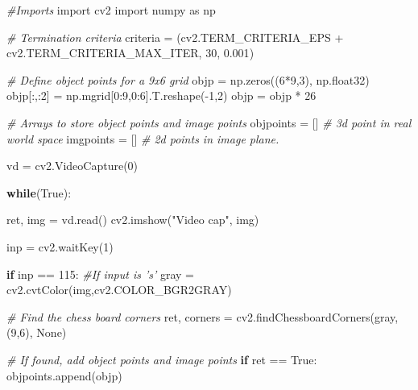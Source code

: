 \documentclass[]{article}
\newenvironment{Shaded}{}{}
\newcommand{\DecValTok}[1]{\textcolor[rgb]{0.25,0.63,0.44}{{#1}}}
\newcommand{\FloatTok}[1]{\textcolor[rgb]{0.25,0.63,0.44}{{#1}}}
\newcommand{\StringTok}[1]{\textcolor[rgb]{0.25,0.44,0.63}{{#1}}}
\newcommand{\ImportTok}[1]{{#1}}
\newcommand{\CommentTok}[1]{\textcolor[rgb]{0.38,0.63,0.69}{\textit{{#1}}}}
\newcommand{\VariableTok}[1]{\textcolor[rgb]{0.10,0.09,0.49}{{#1}}}
\newcommand{\ControlFlowTok}[1]{\textcolor[rgb]{0.00,0.44,0.13}{\textbf{{#1}}}}
\newcommand{\OperatorTok}[1]{\textcolor[rgb]{0.40,0.40,0.40}{{#1}}}
\newcommand{\NormalTok}[1]{{#1}}
\begin{document}
\begin{Shaded}
\begin{Highlighting}[]
\CommentTok{#Imports}
\ImportTok{import} \NormalTok{cv2}
\ImportTok{import} \NormalTok{numpy }\ImportTok{as} \NormalTok{np}

\CommentTok{# Termination criteria}
\NormalTok{criteria }\OperatorTok{=} \NormalTok{(cv2.TERM_CRITERIA_EPS }\OperatorTok{+} \NormalTok{cv2.TERM_CRITERIA_MAX_ITER, }\DecValTok{30}\NormalTok{, }\FloatTok{0.001}\NormalTok{)}

\CommentTok{# Define object points for a 9x6 grid}
\NormalTok{objp }\OperatorTok{=} \NormalTok{np.zeros((}\DecValTok{6}\OperatorTok{*}\DecValTok{9}\NormalTok{,}\DecValTok{3}\NormalTok{), np.float32)}
\NormalTok{objp[:,:}\DecValTok{2}\NormalTok{] }\OperatorTok{=} \NormalTok{np.mgrid[}\DecValTok{0}\NormalTok{:}\DecValTok{9}\NormalTok{,}\DecValTok{0}\NormalTok{:}\DecValTok{6}\NormalTok{].T.reshape(}\OperatorTok{-}\DecValTok{1}\NormalTok{,}\DecValTok{2}\NormalTok{)}
\NormalTok{objp }\OperatorTok{=} \NormalTok{objp }\OperatorTok{*} \DecValTok{26}

\CommentTok{# Arrays to store object points and image points}
\NormalTok{objpoints }\OperatorTok{=} \NormalTok{[] }\CommentTok{# 3d point in real world space}
\NormalTok{imgpoints }\OperatorTok{=} \NormalTok{[] }\CommentTok{# 2d points in image plane.}

\NormalTok{vd }\OperatorTok{=} \NormalTok{cv2.VideoCapture(}\DecValTok{0}\NormalTok{)}

\ControlFlowTok{while}\NormalTok{(}\VariableTok{True}\NormalTok{):}

    \NormalTok{ret, img }\OperatorTok{=} \NormalTok{vd.read()}
    \NormalTok{cv2.imshow(}\StringTok{"Video cap"}\NormalTok{, img)}
   
    \NormalTok{inp }\OperatorTok{=} \NormalTok{cv2.waitKey(}\DecValTok{1}\NormalTok{)}
    
    \ControlFlowTok{if} \NormalTok{inp }\OperatorTok{==} \DecValTok{115}\NormalTok{: }\CommentTok{#If input is 's'}
        \NormalTok{gray }\OperatorTok{=} \NormalTok{cv2.cvtColor(img,cv2.COLOR_BGR2GRAY)}

        \CommentTok{# Find the chess board corners}
        \NormalTok{ret, corners }\OperatorTok{=} \NormalTok{cv2.findChessboardCorners(gray, (}\DecValTok{9}\NormalTok{,}\DecValTok{6}\NormalTok{), }\VariableTok{None}\NormalTok{)}

        \CommentTok{# If found, add object points and image points}
        \ControlFlowTok{if} \NormalTok{ret }\OperatorTok{==} \VariableTok{True}\NormalTok{:}
            \NormalTok{objpoints.append(objp)}


\end{Highlighting}
\end{Shaded}
\end{document}
